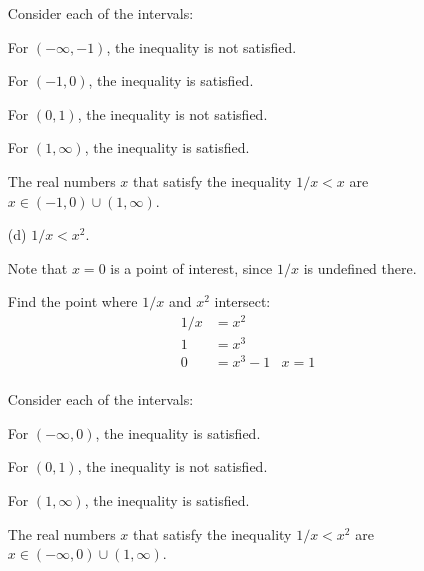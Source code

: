 \documentclass[12pt]{article}
\begin{document}
\begin{itemize}
Consider each of the intervals:

For $\left(-\infty, -1\right)$, the inequality is not satisfied.

For $\left(-1, 0\right)$, the inequality is satisfied.

For $\left(0, 1\right)$, the inequality is not satisfied.

For $\left(1, \infty\right)$, the inequality is satisfied.

The real numbers $x$ that satisfy the inequality $1/x < x$ are $x \in \left(-1, 0\right) \cup \left(1, \infty\right)$.
\item[(d)] $1/x < x^2$.

Note that $x = 0$ is a point of interest, since $1/x$ is undefined there.

Find the point where $1/x$ and $x^2$ intersect:
\begin{align*}
1/x &= x^2 \\
1 &= x^3 \\
0 &= x^3 - 1 & x = 1\\
\end{align*}

Consider each of the intervals:

For $\left(-\infty, 0\right)$, the inequality is satisfied.

For $\left(0, 1\right)$, the inequality is not satisfied.

For $\left(1, \infty\right)$, the inequality is satisfied.

The real numbers $x$ that satisfy the inequality $1/x < x^2$ are $x \in \left(-\infty, 0\right) \cup \left(1, \infty\right)$.

\end{itemize}
\end{document}
